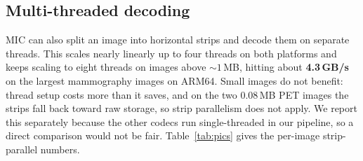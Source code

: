 \documentclass[journal]{IEEEtran}
\begin{document}
\subsection{Multi-threaded decoding}

MIC can also split an image into horizontal strips and decode them on
separate threads. This scales nearly linearly up to four threads on both
platforms and keeps scaling to eight threads on images above ${\sim}1$\,MB,
hitting about \textbf{4.3\,GB/s} on the largest mammography images on ARM64.
Small images do not benefit: thread setup costs more than it saves, and on the
two 0.08\,MB PET images the strips fall back toward raw storage, so strip
parallelism does not apply. We report this separately because the other codecs
run single-threaded in our pipeline, so a direct comparison would not be fair.
Table~\ref{tab:pics} gives the per-image strip-parallel numbers.
\end{document}
